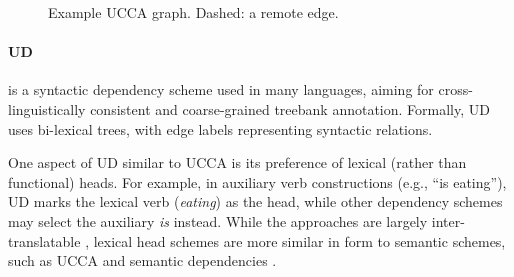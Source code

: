 \documentclass[11pt,a4paper]{article}
\begin{document}
\begin{figure}[th]
  \centering
\caption{\label{fig:example_ucca}
 Example UCCA graph. Dashed: a remote edge.}
\end{figure}



\paragraph{UD}\label{sec:ud}
is a syntactic dependency scheme used in many languages,
aiming for cross-linguistically consistent and coarse-grained treebank
annotation. Formally, UD uses bi-lexical trees, with edge labels 
representing syntactic relations.

  One aspect of UD similar to UCCA is its preference of lexical (rather than functional) heads.
  For example, in auxiliary verb constructions (e.g., ``is eating''), UD
  marks the lexical verb (\textit{eating}) as the head, while other dependency schemes
  may select the auxiliary \textit{is} instead.
  While the approaches are largely inter-translatable
  \citep{Schwartz:12}, lexical head schemes are more similar in form to semantic schemes,
   such as UCCA and semantic dependencies \citep{oepen2016towards}.
   
\end{document}
